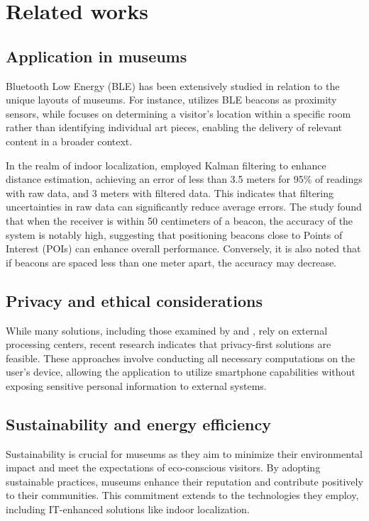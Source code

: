 \chapter{Related works}
\label{chap:related-work}

\section{Application in museums}

Bluetooth Low Energy (BLE) has been extensively studied in relation to the unique layouts of museums. For instance, \cite{barsocchi_detecting_2021} utilizes BLE beacons as proximity sensors, while \cite{verde_indoor_2023} focuses on determining a visitor's location within a specific room rather than identifying individual art pieces, enabling the delivery of relevant content in a broader context. 

In the realm of indoor localization, \cite{spachos_ble_2020} employed Kalman filtering to enhance distance estimation, achieving an error of less than 3.5 meters for 95\% of readings with raw data, and 3 meters with filtered data. This indicates that filtering uncertainties in raw data can significantly reduce average errors. The study found that when the receiver is within 50 centimeters of a beacon, the accuracy of the system is notably high, suggesting that positioning beacons close to Points of Interest (POIs) can enhance overall performance. Conversely, it is also noted that if beacons are spaced less than one meter apart, the accuracy may decrease.

\section{Privacy and ethical considerations}

While many solutions, including those examined by \cite{alletto_indoor_2016} and \cite{spachos_ble_2020}, rely on external processing centers, recent research indicates that privacy-first solutions are feasible. These approaches involve conducting all necessary computations on the user's device, allowing the application to utilize smartphone capabilities without exposing sensitive personal information to external systems.

\section{Sustainability and energy efficiency}

Sustainability is crucial for museums as they aim to minimize their environmental impact and meet the expectations of eco-conscious visitors. By adopting sustainable practices, museums enhance their reputation and contribute positively to their communities. This commitment extends to the technologies they employ, including IT-enhanced solutions like indoor localization. 

